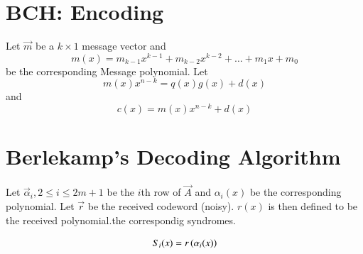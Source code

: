 \documentclass[journal,12pt,twocolumn]{IEEEtran}
\renewcommand\thesection{\arabic{section}}
\begin{document}

\section{BCH: Encoding}
 Let $\vec{m}$ be a $k \times 1$ message vector and  
\begin{equation}
m(x)=m_{k-1}x^{k-1}+m_{k-2}x^{k-2}+\dots+m_1x+m_0
\end{equation} 
be the  corresponding Message polynomial. 
Let 
\begin{equation}
m(x)x^{n-k} = q(x)g(x)+d(x)
\end{equation} 
and 
\begin{equation}
c(x)=m(x)x^{n-k}+d(x)
\end{equation}
%

\section{Berlekamp's Decoding Algorithm}

Let $\vec{\alpha}_i, 2 \le i \le 2m+1$ be the $i$th row of $\vec{A}$ and $\alpha_i(x)$ be the
corresponding polynomial. Let $\vec{r}$ be the received codeword (noisy). $r(x)$ is then defined to be the 
received polynomial.the correspondig syndromes. 

\begin{equation}
S_i(x) = r\left(\alpha_i(x)\right)
\end{equation}
\end{document}
